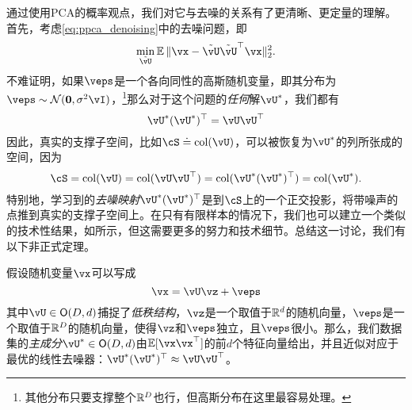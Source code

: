 \documentclass[../../book-main_zh.tex]{subfiles}
\begin{document}
\begin{remark}
    通过使用PCA的概率观点，我们对它与去噪的关系有了更清晰、更定量的理解。首先，考虑\eqref{eq:ppca_denoising}中的去噪问题，即
    \begin{equation}
        \min_{\tilde{\vU}}\Ex\norm{\vx - \tilde{\vU}\tilde{\vU}^{\top}\vx}_{2}^{2}.
    \end{equation}
    不难证明，如果\(\veps\)是一个各向同性的高斯随机变量，即其分布为\(\veps \sim \dNorm(\vzero, \sigma^{2}\vI)\)，\footnote{其他分布只要支撑整个\(\mathbb{R}^{D}\)也行，但高斯分布在这里最容易处理。}那么对于这个问题的\textit{任何}解\(\vU^{\ast}\)，我们都有
    \begin{equation}
        \vU^{\ast}(\vU^{\ast})^{\top} = \vU\vU^{\top}
    \end{equation}
    因此，真实的支撑子空间，比如\(\cS \doteq \mathrm{col}(\vU)\)，可以被恢复为\(\vU^{\ast}\)的列所张成的空间，因为
    \begin{equation}
        \cS = \mathrm{col}(\vU) = \mathrm{col}(\vU\vU^{\top}) = \mathrm{col}(\vU^{\ast}(\vU^{\ast})^{\top}) = \mathrm{col}(\vU^{\ast}).
    \end{equation}
    特别地，学习到的\textit{去噪映射}\(\vU^{\ast}(\vU^{\ast})^{\top}\)是到\(\cS\)上的一个正交投影，将带噪声的点推到真实的支撑子空间上。在只有有限样本的情况下，我们也可以建立一个类似的技术性结果，如所示，但这需要更多的努力和技术细节。总结这一讨论，我们有以下非正式定理。
\end{remark}


\begin{theorem}\label{thm:ppca}
    假设随机变量\(\vx\)可以写成
    \begin{equation}
        \vx = \vU\vz + \veps
    \end{equation}
    其中\(\vU \in \O(D, d)\)捕捉了\textit{低秩结构}，\(\vz\)是一个取值于\(\mathbb{R}^{d}\)的随机向量，\(\veps\)是一个取值于\(\mathbb{R}^{D}\)的随机向量，使得\(\vz\)和\(\veps\)独立，且\(\veps\)很小。那么，我们数据集的\textit{主成分}\(\vU^{\ast} \in \O(D, d)\)由\(\Ex[\vx\vx^{\top}]\)的前\(d\)个特征向量给出，并且近似对应于最优的线性去噪器：\(\vU^{\ast}(\vU^{\ast})^{\top} \approx \vU\vU^{\top}\)。
\end{theorem}


\end{document}
